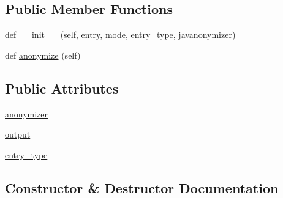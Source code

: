 \subsection*{Public Member Functions}
\begin{DoxyCompactItemize}
\item 
def \hyperlink{classparlai_1_1utils_1_1anonymizer_1_1FullAnonymizer_ac58c9de377c9f79ada18d88657da4f09}{\+\_\+\+\_\+init\+\_\+\+\_\+} (self, \hyperlink{classparlai_1_1utils_1_1anonymizer_1_1Anonymizer_a348d1fd062fa3f57ad81cce32e8dd2c7}{entry}, \hyperlink{classparlai_1_1utils_1_1anonymizer_1_1Anonymizer_a535b959cd821885d5af2831644cde735}{mode}, \hyperlink{classparlai_1_1utils_1_1anonymizer_1_1FullAnonymizer_a95080b7f5bd386981a082671431df555}{entry\+\_\+type}, javanonymizer)
\item 
def \hyperlink{classparlai_1_1utils_1_1anonymizer_1_1FullAnonymizer_a52bb75b8a8406fd69f3fec4134bab054}{anonymize} (self)
\end{DoxyCompactItemize}
\subsection*{Public Attributes}
\begin{DoxyCompactItemize}
\item 
\hyperlink{classparlai_1_1utils_1_1anonymizer_1_1FullAnonymizer_a70fcdf554f74a86b63ef8950241f813e}{anonymizer}
\item 
\hyperlink{classparlai_1_1utils_1_1anonymizer_1_1FullAnonymizer_acf1b1219e757e42e5389a7dee4486c30}{output}
\item 
\hyperlink{classparlai_1_1utils_1_1anonymizer_1_1FullAnonymizer_a95080b7f5bd386981a082671431df555}{entry\+\_\+type}
\end{DoxyCompactItemize}


\subsection{Constructor \& Destructor Documentation}
\mbox{\label{classparlai_1_1utils_1_1anonymizer_1_1FullAnonymizer_ac58c9de377c9f79ada18d88657da4f09}} 
